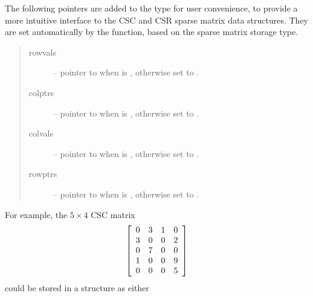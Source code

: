 \documentclass[letterpaper,10pt,english]{sphinxmanual}
\begin{document}
The following pointers are added to the  type for user
convenience, to provide a more intuitive interface to the CSC and CSR
sparse matrix data structures. They are set automatically by the
{\hyperref[linear_solvers/SLS:c.NewSparseMat]{\emph{}}} function, based on the sparse matrix storage
type.
\begin{quote}\begin{description}
\item[{rowvals}] \leavevmode
-- pointer to  when  is ,
otherwise set to .

\item[{colptrs}] \leavevmode
-- pointer to  when  is ,
otherwise set to .

\item[{colvals}] \leavevmode
-- pointer to  when  is ,
otherwise set to .

\item[{rowptrs}] \leavevmode
-- pointer to  when  is ,
otherwise set to .

\end{description}\end{quote}

For example, the \(5\times 4\) CSC matrix
\begin{gather}
\begin{split}\left[\begin{array}{cccc}
   0 & 3 & 1 & 0\\
   3 & 0 & 0 & 2\\
   0 & 7 & 0 & 0\\
   1 & 0 & 0 & 9\\
   0 & 0 & 0 & 5
\end{array}\right]\end{split}\notag
\end{gather}
could be stored in a {\hyperref[linear_solvers/SLS:c.SlsMat]{\emph{}}} structure as either
\end{document}
